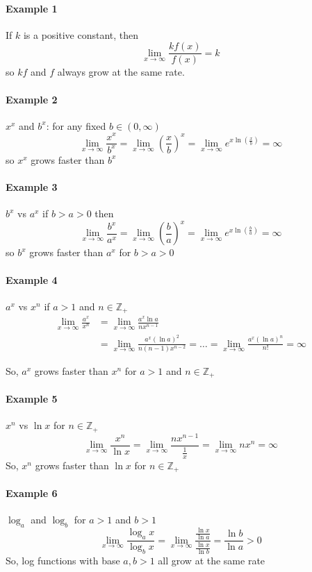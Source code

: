 \documentclass[12pt]{article}
\begin{document}
\paragraph{Example 1} If $k$ is a positive constant, then 
\[
    \lim_{x \to \infty} \frac{k f(x)}{f(x)} = k 
\]
so $kf$ and $f$ always grow at the same rate.

\paragraph{Example 2} $x^x$ and $b^x$: for any fixed $b \in (0, \infty)$
\[
    \lim_{x \to \infty} \frac{x^x}{b^x} = \lim_{x \to \infty} \left(\frac{x}{b}\right)^x = \lim_{x \to \infty} e^{x \ln (\frac{x}{b})} = \infty 
\]
so $x^x$ grows faster than $b^x$

\paragraph{Example 3} $b^x$ vs $a^x$ if $b > a > 0$ then 
\[
    \lim_{x \to \infty} \frac{b^x}{a^x} = \lim_{x \to \infty} \left( \frac{b}{a} \right)^x = \lim_{x \to \infty} e^{x \ln (\frac{b}{a})} = \infty
\]
so $b^x$ grows faster than $a^x$ for $b > a > 0$

\paragraph{Example 4} $a^x$ vs $x^n$ if $a > 1$ and $n \in \mathbb{Z}_{+}$
\begin{align*} 
    \lim_{x \to \infty} \frac{a^x}{x^n} &= \lim_{x \to \infty} \frac{a^x \ln a}{nx^{n - 1}} \\
    &= \lim_{x \to \infty} \frac{a^x (\ln a)^2}{n(n -1)x^{n - 2}} = \dots = \lim_{x \to \infty} \frac{a^x(\ln a)^n}{n!} = \infty 
\end{align*}

So, $a^x$ grows faster than $x^n$ for $a > 1$ and $n \in \mathbb{Z}_{+}$

\paragraph{Example 5} $x^n$ vs $\ln x$ for $n \in \mathbb{Z}_{+}$
\[
    \lim_{x \to \infty} \frac{x^n}{\ln x} = \lim_{x \to \infty} \frac{nx^{n - 1}}{\frac{1}{x}} = \lim_{x \to \infty} nx^n = \infty 
\]
So, $x^n$ grows faster than $\ln x$ for $n \in \mathbb{Z}_{+}$

\paragraph{Example 6} $\log_a$ and $\log_b$ for $a > 1$ and $b > 1$
\[
    \lim_{x \to \infty} \frac{\log_a x}{\log_b x} = \lim_{x \to \infty} \frac{\frac{\ln x}{\ln a}}{\frac{\ln x}{\ln b}} = \frac{\ln b}{\ln a} > 0 
\]
So, log functions with base $a, b > 1$ all grow at the same rate
\end{document}

